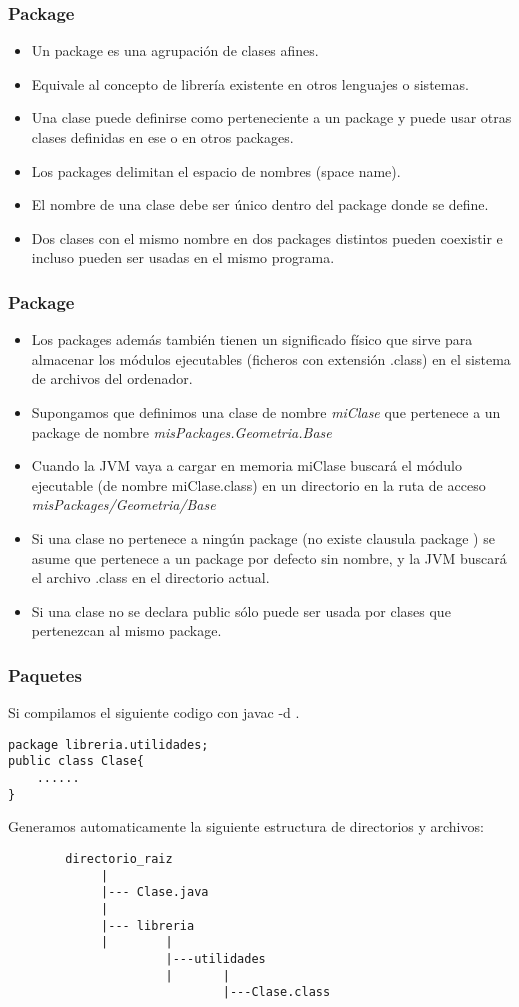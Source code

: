 \documentclass{beamer}
\begin{document}
\begin{frame}
    \frametitle{Package}
    
\begin{itemize}[<+-| alert@+>]
\item Un package es una agrupación de clases afines.
\item Equivale al concepto de librería existente en otros lenguajes o sistemas.
\item Una clase puede definirse como perteneciente a un package y puede usar otras clases definidas en ese o en otros packages.
\item Los packages delimitan el espacio de nombres (space name).
\item El nombre de una clase debe ser único dentro del package donde se define.
\item Dos clases con el mismo nombre en dos packages distintos pueden coexistir e incluso pueden ser usadas en el mismo programa.
\end{itemize}
\pause
\end{frame}

\begin{frame}
    \frametitle{Package}
    
\begin{itemize}[<+-| alert@+>]
\item Los packages además también tienen un significado físico que sirve para almacenar los módulos ejecutables (ficheros con extensión .class) en el sistema de archivos del ordenador. 
\item Supongamos que definimos una clase de nombre \emph{miClase} que pertenece a un package de nombre \emph{misPackages.Geometria.Base}
\item Cuando la JVM vaya a cargar en memoria miClase  buscará el módulo ejecutable (de nombre miClase.class) en un directorio en la ruta de acceso \emph{misPackages/Geometria/Base}
\item Si una clase no pertenece a ningún package (no existe clausula package )  se asume que pertenece a un package por defecto sin nombre, y la JVM buscará el archivo .class en el directorio actual. 
\item Si una clase no se declara public sólo puede ser usada por clases que pertenezcan al mismo package.  
\end{itemize}
\pause
\end{frame}

\begin{frame}[fragile]
\frametitle{Paquetes}
Si compilamos el siguiente codigo con \alert{javac -d .}
\begin{verbatim}
package libreria.utilidades;
public class Clase{
    ......
}
\end{verbatim}
\pause 
Generamos automaticamente la siguiente estructura de directorios y archivos:
\pause
\begin{verbatim}
        directorio_raiz
             |
             |--- Clase.java
             |
             |--- libreria
             |        |
                      |---utilidades
                      |       |
                              |---Clase.class
\end{verbatim}

\end{frame}
\end{document}
